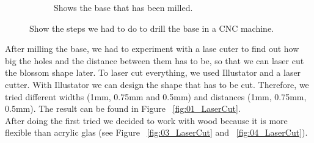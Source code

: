 \documentclass[00_doc.tex]{subfiles}
\begin{document}
\begin{figure}[H]
\begin{subfigure}{.45\textwidth}
            \caption{Shows the base that has been milled.}
            \label{fig:blossomBase}
            \vspace{6mm}
        \end{subfigure}
        \caption{Show the steps we had to do to drill the base in a CNC machine.}
        \label{fig:laserCutTests}
    \end{figure}


    \noindent
    After milling the base, we had to experiment with a lase cuter to find out how big the holes and the distance between them 
    has to be, so that we can laser cut the blossom shape later. To laser cut everything, we used Illustator\cite{illustrator} 
    and a laser cutter. With Illustator we can design the shape that has to be cut. Therefore, we tried different widths (1mm, 
    0.75mm and 0.5mm) and distances (1mm, 0.75mm, 0.5mm). The result can be found in Figure ~\ref{fig:01_LaserCut}.\\
    \noindent
    After doing the first tried we decided to work with wood because it is more flexible 
    than acrylic glas (see Figure ~\ref{fig:03_LaserCut} and ~\ref{fig:04_LaserCut}).
\end{document}

